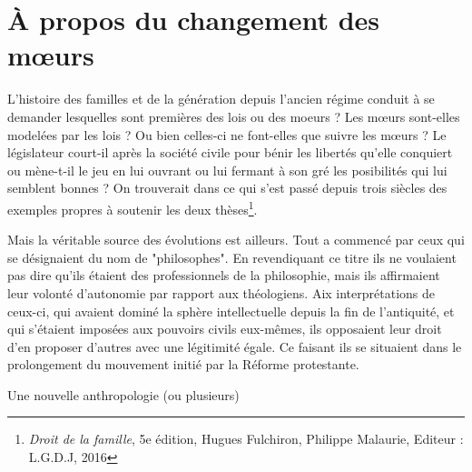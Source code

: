 \chapter{À propos du changement des mœurs}
 
L'histoire des familles et de la génération depuis l'ancien régime conduit à se demander   lesquelles sont premières des lois ou des moeurs ? Les mœurs sont-elles modelées par les  lois ? Ou bien celles-ci ne font-elles que suivre les mœurs ? Le législateur court-il après la société civile pour bénir les libertés qu'elle conquiert ou mène-t-il le jeu en lui ouvrant ou lui fermant à son gré les posibilités qui lui semblent bonnes ? On trouverait dans ce qui s'est passé depuis trois siècles des exemples propres à soutenir les deux thèses\footnote{\emph{Droit de la famille}, 5e édition, Hugues Fulchiron, Philippe Malaurie, Editeur : L.G.D.J, 2016}.

Mais la véritable source des évolutions est ailleurs.
Tout a commencé par ceux qui se désignaient du nom de "philosophes". En revendiquant ce titre ils ne voulaient pas dire qu'ils étaient des professionnels de la philosophie, mais ils affirmaient leur volonté d'autonomie par rapport aux théologiens. Aix interprétations de ceux-ci, qui avaient dominé la sphère intellectuelle depuis la fin de l'antiquité, et qui s'étaient imposées aux pouvoirs civils eux-mêmes, ils opposaient leur droit d'en proposer d'autres avec une légitimité égale. Ce faisant ils se situaient dans le prolongement du mouvement initié par la Réforme protestante.  

Une nouvelle anthropologie (ou plusieurs)
 
